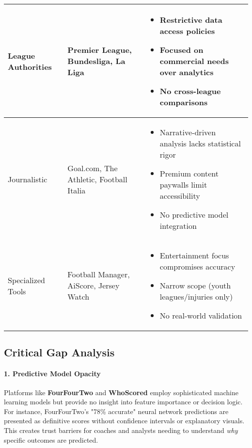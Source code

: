 \begin{table}[h!]
\begin{tabularx}{\textwidth}{|l|X|X|}
        League Authorities & Premier League, Bundesliga, La Liga & 
        \begin{itemize}
            \item Restrictive data access policies
            \item Focused on commercial needs over analytics
            \item No cross-league comparisons
        \end{itemize} \\
        \hline
        Journalistic & Goal.com, The Athletic, Football Italia & 
        \begin{itemize}
            \item Narrative-driven analysis lacks statistical rigor
            \item Premium content paywalls limit accessibility
            \item No predictive model integration
        \end{itemize} \\
        \hline
        Specialized Tools & Football Manager, AiScore, Jersey Watch & 
        \begin{itemize}
            \item Entertainment focus compromises accuracy
            \item Narrow scope (youth leagues/injuries only)
            \item No real-world validation
        \end{itemize} \\
        \hline
    \end{tabularx}
\end{table}

\subsection{Critical Gap Analysis}

\paragraph{1. Predictive Model Opacity}
Platforms like \textbf{FourFourTwo} and \textbf{WhoScored} employ sophisticated machine learning models but provide no insight into feature importance or decision logic. For instance, FourFourTwo's "78\% accurate" neural network predictions are presented as definitive scores without confidence intervals or explanatory visuals. This creates trust barriers for coaches and analysts needing to understand \textit{why} specific outcomes are predicted.

